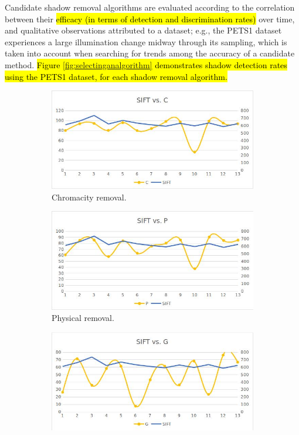 Candidate shadow removal algorithms are evaluated according to the correlation between their \hl{efficacy (in terms of detection and discrimination rates)} over time, and qualitative observations attributed to a dataset; e.g., the PETS1 dataset experiences a large illumination change midway through its sampling, which is taken into account when searching for trends among the accuracy of a candidate method. \hl{Figure \ref{fig:selectinganalgorithm} demonstrates shadow detection rates using the PETS1 dataset, for each shadow removal algorithm.}

\begin{figure}
\centering
\begin{subfigure}{.49\linewidth}
  \includegraphics[width=1\linewidth]{figures/selectinganalgorithm_chromacity.jpg}
  \caption{Chromacity removal.}
\end{subfigure}
\hfill
\begin{subfigure}{.49\linewidth}
  \includegraphics[width=1\linewidth]{figures/selectinganalgorithm_physical.jpg}
  \caption{Physical removal.}
\end{subfigure}
\hfill
\begin{subfigure}{.49\linewidth}
  \includegraphics[width=1\linewidth]{figures/selectinganalgorithm_geometry.jpg}

\end{subfigure}
\end{figure}
